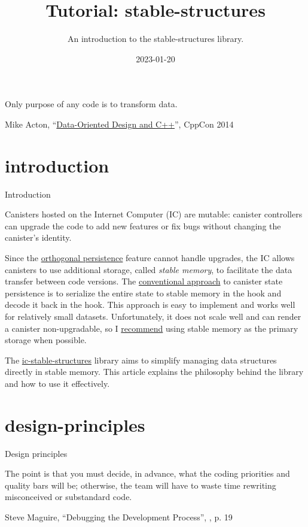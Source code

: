 \documentclass{article}
\title{Tutorial: stable-structures}
\subtitle{An introduction to the stable-structures library.}
\date{2023-01-20}
\begin{document}
\epigraph{
  Only purpose of any code is to transform data.
}{Mike Acton, ``\href{https://youtu.be/rX0ItVEVjHc?t=1360}{Data-Oriented Design and C++}'', CppCon 2014}

\section{introduction}{Introduction}

Canisters hosted on the Internet Computer (IC) are mutable: canister controllers can upgrade the code to add new features or fix bugs without changing the canister's identity.

Since the \href{/posts/06-ic-orthogonal-persistence.html#upgrades}{orthogonal persistence} feature cannot handle upgrades, the IC allows canisters to use additional storage, called \emph{stable memory}, to facilitate the data transfer between code versions.
The \href{/posts/11-ii-stable-memory.html#conventional-memory-management}{conventional approach} to canister state persistence is to serialize the entire state to stable memory in the  hook and decode it back in the  hook.
This approach is easy to implement and works well for relatively small datasets.
Unfortunately, it does not scale well and can render a canister non-upgradable, so I \href{/posts/01-effective-rust-canisters.html#stable-memory-main}{recommend} using stable memory as the primary storage when possible.


The \href{https://github.com/dfinity/stable-structures}{ic-stable-structures} library aims to simplify managing data structures directly in stable memory.
This article explains the philosophy behind the library and how to use it effectively.

\section{design-principles}{Design principles}
\epigraph{
    The point is that you must decide, in advance, what the coding priorities and quality bars will be; otherwise, the team will have to waste time rewriting misconceived or substandard code.
}{Steve Maguire, ``Debugging the Development Process'', , p. 19}
\end{document}
